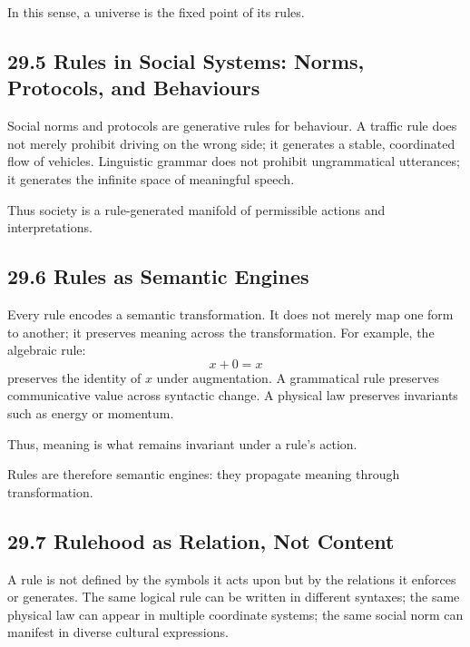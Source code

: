 \documentclass[12pt,letterpaper]{article}
\theoremstyle{remark}
\begin{document}
In this sense, a universe is the fixed point of its rules.

\subsection{29.5 Rules in Social Systems: Norms, Protocols, and Behaviours}

Social norms and protocols are generative rules for behaviour. A traffic rule does not merely prohibit driving on the wrong side; it generates a stable, coordinated flow of vehicles. Linguistic grammar does not prohibit ungrammatical utterances; it generates the infinite space of meaningful speech.

Thus society is a rule-generated manifold of permissible actions and interpretations.

\subsection{29.6 Rules as Semantic Engines}

Every rule encodes a semantic transformation. It does not merely map one form to another; it preserves meaning across the transformation. For example, the algebraic rule:
\[
x + 0 = x
\]
preserves the identity of \(x\) under augmentation. A grammatical rule preserves communicative value across syntactic change. A physical law preserves invariants such as energy or momentum.

Thus, meaning is what remains invariant under a rule’s action.

Rules are therefore semantic engines: they propagate meaning through transformation.

\subsection{29.7 Rulehood as Relation, Not Content}

A rule is not defined by the symbols it acts upon but by the relations it enforces or generates. The same logical rule can be written in different syntaxes; the same physical law can appear in multiple coordinate systems; the same social norm can manifest in diverse cultural expressions.
\end{document}
